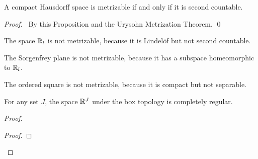\begin{corollary}
    A compact Hausdorff space is metrizable if and only if it is second countable.
\end{corollary}

\begin{proof}
    \pf\ By this Proposition and the Urysohn Metrization Theorem. \qed
\end{proof}

\begin{example}
    The space $\mathbb{R}_l$ is not metrizable, because it is Lindel\"{o}f but not
    second countable.
\end{example}

\begin{corollary}
    The Sorgenfrey plane is not metrizable, because it has a subspace homeomorphic to $\mathbb{R}_l$.
\end{corollary}

\begin{example}
    The ordered square is not metrizable, because it is compact but not separable.
\end{example}

\begin{proposition}
    For any set $J$, the space $\mathbb{R}^J$ under the box topology is completely regular.
\end{proposition}

\begin{proof}
    \pf
    \begin{proof}
    \end{proof}
\end{proof}


